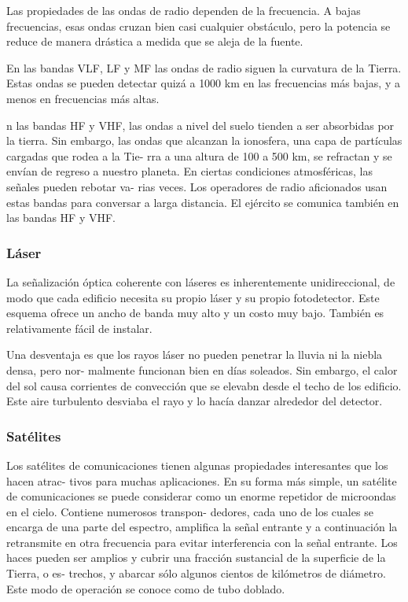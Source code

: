 Las propiedades de las ondas de radio dependen de la frecuencia. A bajas frecuencias, esas ondas cruzan bien casi cualquier obstáculo, pero la potencia se reduce de manera drástica a medida que se aleja de la fuente.

En las bandas VLF, LF y MF las ondas de radio siguen la curvatura de la Tierra. Estas ondas se pueden detectar quizá a 1000 km en las frecuencias más bajas, y a menos en frecuencias más altas.

n las bandas HF y VHF, las ondas a nivel del suelo tienden a ser absorbidas por la tierra. Sin
embargo, las ondas que alcanzan la ionosfera, una capa de partículas cargadas que rodea a la Tie-
rra a una altura de 100 a 500 km, se refractan y se envían de regreso a nuestro planeta. En ciertas condiciones atmosféricas, las señales pueden rebotar va-
rias veces. Los operadores de radio aficionados usan estas bandas para conversar a larga distancia.
El ejército se comunica también en las bandas HF y VHF.

\subsubsection*{Láser}
La señalización óptica coherente con láseres es inherentemente unidireccional, de modo que cada edificio necesita su propio láser y su propio fotodetector. Este esquema ofrece un ancho de banda muy alto y un costo muy bajo. También es relativamente fácil de instalar.

Una desventaja es que los rayos láser no pueden penetrar la lluvia ni la niebla densa, pero nor-
malmente funcionan bien en días soleados. Sin embargo, el calor del sol causa corrientes de convección que se elevabn desde el techo de los edificio. Este aire turbulento desviaba el rayo y lo hacía danzar alrededor del detector.

\subsubsection*{Satélites}
Los satélites de comunicaciones tienen algunas propiedades interesantes que los hacen atrac-
tivos para muchas aplicaciones. En su forma más simple, un satélite de comunicaciones se puede
considerar como un enorme repetidor de microondas en el cielo. Contiene numerosos transpon-
dedores, cada uno de los cuales se encarga de una parte del espectro, amplifica la señal entrante
y a continuación la retransmite en otra frecuencia para evitar interferencia con la señal entrante.
Los haces pueden ser amplios y cubrir una fracción sustancial de la superficie de la Tierra, o es-
trechos, y abarcar sólo algunos cientos de kilómetros de diámetro. Este modo de operación se
conoce como de tubo doblado.

